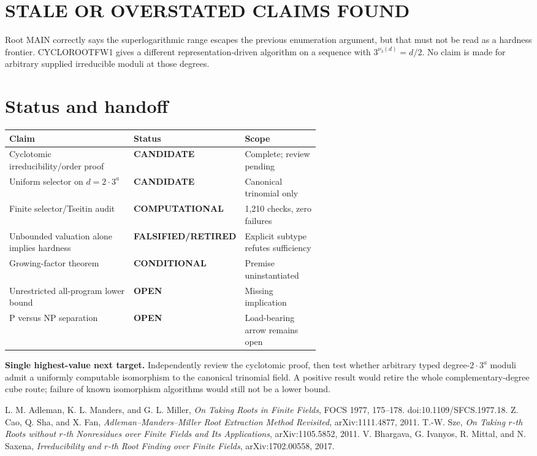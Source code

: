\documentclass[11pt]{article}
\newcommand{\COMP}{\textbf{COMPUTATIONAL}}
\newcommand{\COND}{\textbf{CONDITIONAL}}
\newcommand{\CAND}{\textbf{CANDIDATE}}
\newcommand{\OPEN}{\textbf{OPEN}}
\newcommand{\RET}{\textbf{FALSIFIED/RETIRED}}
\begin{document}
\section{STALE OR OVERSTATED CLAIMS FOUND}
Root MAIN correctly says the superlogarithmic range escapes the previous
enumeration argument, but that must not be read as a hardness frontier.
CYCLOROOTFW1 gives a different representation-driven algorithm on a sequence
with $3^{\nu_3(d)}=d/2$.  No claim is made for arbitrary supplied irreducible
moduli at those degrees.

\section{Status and handoff}
\begin{center}
\begin{tabularx}{0.98\linewidth}{p{0.40\linewidth}p{0.19\linewidth}X}
\toprule
Claim & Status & Scope \\
\midrule
Cyclotomic irreducibility/order proof & \CAND & Complete; review pending \\
Uniform selector on $d=2\cdot3^a$ & \CAND & Canonical trinomial only \\
Finite selector/Tseitin audit & \COMP & 1,210 checks, zero failures \\
Unbounded valuation alone implies hardness & \RET & Explicit subtype refutes sufficiency \\
Growing-factor theorem & \COND & Premise uninstantiated \\
Unrestricted all-program lower bound & \OPEN & Missing implication \\
P versus NP separation & \OPEN & Load-bearing arrow remains open \\
\bottomrule
\end{tabularx}
\end{center}

\textbf{Single highest-value next target.}
Independently review the cyclotomic proof, then test whether arbitrary typed
degree-$2\cdot3^a$ moduli admit a uniformly computable isomorphism to the
canonical trinomial field.  A positive result would retire the whole
complementary-degree cube route; failure of known isomorphism algorithms
would still not be a lower bound.

\begin{thebibliography}{9}
L. M. Adleman, K. L. Manders, and G. L. Miller,
\emph{On Taking Roots in Finite Fields}, FOCS 1977, 175--178.
doi:10.1109/SFCS.1977.18.
Z. Cao, Q. Sha, and X. Fan,
\emph{Adleman--Manders--Miller Root Extraction Method Revisited},
arXiv:1111.4877, 2011.
T.-W. Sze,
\emph{On Taking $r$-th Roots without $r$-th Nonresidues over Finite Fields
and Its Applications}, arXiv:1105.5852, 2011.
V. Bhargava, G. Ivanyos, R. Mittal, and N. Saxena,
\emph{Irreducibility and $r$-th Root Finding over Finite Fields},
arXiv:1702.00558, 2017.
\end{thebibliography}
\end{document}
